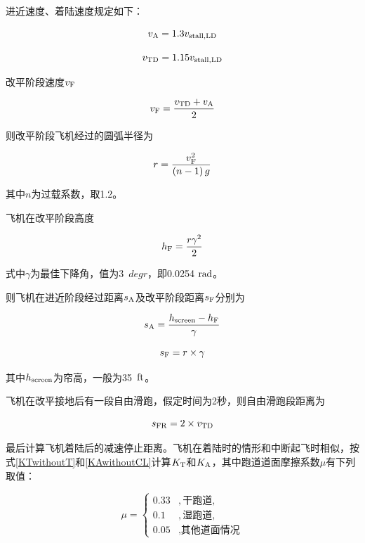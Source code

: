 \documentclass[a4paper,punct,space,heading=true,AutoFakeBold]{ctexrep}
\begin{document}
进近速度、着陆速度规定如下：

\begin{equation}
v_{\rm A}=1.3v_{\rm stall,LD}
\end{equation}

\begin{equation}
v_{\rm TD}=1.15v_{\rm stall,LD}
\end{equation}

改平阶段速度$v_{\rm F}$

\begin{equation}
v_{\rm F}=\frac{v_{\rm TD}+v_{\rm A}}{2}
\end{equation}

则改平阶段飞机经过的圆弧半径为

\begin{equation}
r=\frac{v_{\rm F}^2}{\left(n-1\right)g}
\end{equation}

其中$n$为过载系数，取1.2。

飞机在改平阶段高度

\begin{equation}
h_{\rm F}=\frac{r\gamma^2}{2}
\end{equation}

式中$\gamma$为最佳下降角，值为3\ $degr$，即0.0254 $\rm rad$。

则飞机在进近阶段经过距离$s_{\rm A}$及改平阶段距离$s_{\rm F}$分别为

\begin{equation}
s_{\rm A}=\frac{h_{\rm screen}-h_{\rm F}}{\gamma}
\end{equation}

\begin{equation}
s_{\rm F}=r\times \gamma
\end{equation}

其中$h_{\rm screen}$为帘高，一般为35\ $\rm ft$。

飞机在改平接地后有一段自由滑跑，假定时间为2秒，则自由滑跑段距离为

\begin{equation}
s_{\rm FR}=2\times v_{\rm TD}
\end{equation}

最后计算飞机着陆后的减速停止距离。飞机在着陆时的情形和中断起飞时相似，按式\ref{KTwithoutT}和\ref{KAwithoutCL}计算$K_{\rm T}$和$K_{\rm A}$，其中跑道道面摩擦系数$\mu$有下列取值：

\begin{equation}
\mu=\left\{\begin{array}{ll}
0.33   &   , \text{干跑道},\\    
0.1   &   , \text{湿跑道},\\
0.05   &   , \text{其他道面情况}
\end{array}\right.
\end{equation}
\end{document}
